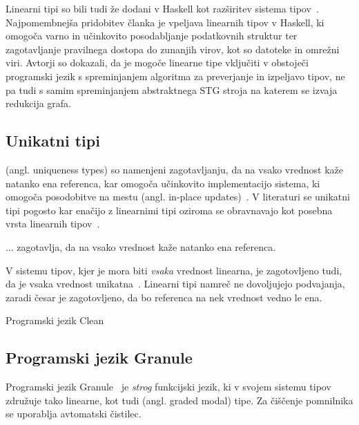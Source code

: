 Linearni tipi so bili tudi že dodani v Haskell kot razširitev sistema tipov~\cite{bernardy2018linear}. Najpomembnejša pridobitev članka je vpeljava linearnih tipov v Haskell, ki omogoča varno in učinkovito posodabljanje podatkovnih struktur ter zagotavljanje pravilnega dostopa do zunanjih virov, kot so datoteke in omrežni viri. Avtorji so dokazali, da je mogoče linearne tipe vključiti v obstoječi programski jezik s spreminjanjem algoritma za preverjanje in izpeljavo tipov, ne pa tudi s samim spreminjanjem abstraktnega STG stroja na katerem se izvaja redukcija grafa.

\subsection{Unikatni tipi}
\label{sec:unikatni-tipi}


 (angl. uniqueness types) so namenjeni zagotavljanju, da na vsako vrednost kaže natanko ena referenca, kar omogoča učinkovito implementacijo sistema, ki omogoča posodobitve na mestu (angl. in-place updates)~\cite{marshall2022linearity}.  V literaturi se unikatni tipi pogosto kar enačijo z linearnimi tipi oziroma se obravnavajo kot posebna vrsta linearnih tipov~\cite{pierce2004advanced, wadler1990linear, wadler1991there}.

... zagotavlja, da na vsako vrednost kaže natanko ena referenca.

V sistemu tipov, kjer je mora biti \textit{vsaka} vrednost linearna, je zagotovljeno tudi, da je vsaka vrednost unikatna~\cite{marshall2022linearity}. Linearni tipi namreč ne dovoljujejo podvajanja, zaradi česar je zagotovljeno, da bo referenca na nek vrednost vedno le ena. 

Programski jezik Clean

\subsection{Programski jezik Granule}
\label{sec:}

Programski jezik Granule~\cite{orchard2019quantitative} je \textit{strog} funkcijski jezik, ki v svojem sistemu tipov združuje tako linearne, kot tudi  (angl. graded modal) tipe. 
Za čiščenje pomnilnika se uporablja avtomatski čistilec.

